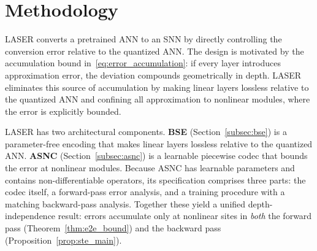 \documentclass{article}
\theoremstyle{plain}
\theoremstyle{definition}
\theoremstyle{remark}
\begin{document}
\section{Methodology}
\label{sec:methodology}

LASER converts a pretrained ANN to an SNN by directly controlling the
conversion error relative to the quantized ANN. The design is motivated by
the accumulation bound in~\eqref{eq:error_accumulation}: if every layer
introduces approximation error, the deviation compounds geometrically in
depth. LASER eliminates this source of accumulation by making linear layers
lossless relative to the quantized ANN and confining all approximation to
nonlinear modules, where the error is explicitly bounded.

LASER has two architectural components. \textbf{BSE}
(Section~\ref{subsec:bse}) is a parameter-free encoding that makes linear
layers lossless relative to the quantized ANN. \textbf{ASNC}
(Section~\ref{subsec:asnc}) is a learnable piecewise codec that bounds the
error at nonlinear modules. Because ASNC has learnable parameters and
contains non-differentiable operators, its specification comprises three
parts: the codec itself, a forward-pass error analysis, and a training
procedure with a matching backward-pass analysis. Together these yield a
unified depth-independence result: errors accumulate only at nonlinear
sites in \emph{both} the forward pass (Theorem~\ref{thm:e2e_bound}) and the
backward pass (Proposition~\ref{prop:ste_main}).
\end{document}
